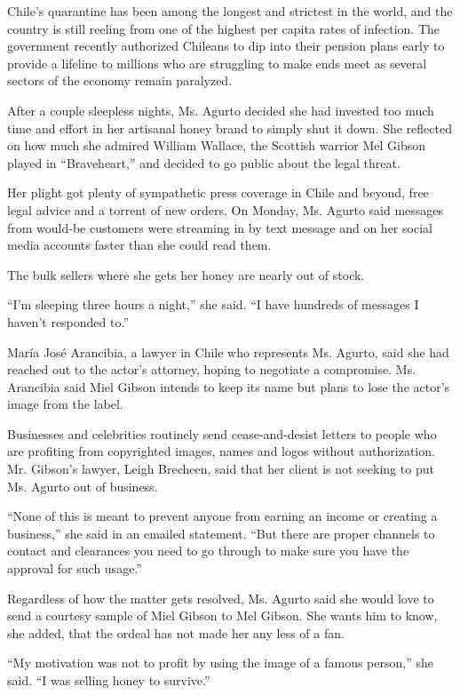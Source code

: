 Chile's quarantine has been among the longest and strictest in the
world, and the country is still reeling from one of the highest per
capita rates of infection. The government recently authorized Chileans
to dip into their pension plans early to provide a lifeline to millions
who are struggling to make ends meet as several sectors of the economy
remain paralyzed.

After a couple sleepless nights, Ms. Agurto decided she had invested too
much time and effort in her artisanal honey brand to simply shut it
down. She reflected on how much she admired William Wallace, the
Scottish warrior Mel Gibson played in ``Braveheart,'' and decided to go
public about the legal threat.

Her plight got plenty of sympathetic press coverage in Chile and beyond,
free legal advice and a torrent of new orders. On Monday, Ms. Agurto
said messages from would-be customers were streaming in by text message
and on her social media accounts faster than she could read them.

The bulk sellers where she gets her honey are nearly out of stock.

``I'm sleeping three hours a night,'' she said. ``I have hundreds of
messages I haven't responded to.''

María José Arancibia, a lawyer in Chile who represents Ms. Agurto, said
she had reached out to the actor's attorney, hoping to negotiate a
compromise. Ms. Arancibia said Miel Gibson intends to keep its name but
plans to lose the actor's image from the label.

Businesses and celebrities routinely send cease-and-desist letters to
people who are profiting from copyrighted images, names and logos
without authorization. Mr. Gibson's lawyer, Leigh Brecheen, said that
her client is not seeking to put Ms. Agurto out of business.

``None of this is meant to prevent anyone from earning an income or
creating a business,'' she said in an emailed statement. ``But there are
proper channels to contact and clearances you need to go through to make
sure you have the approval for such usage.''

Regardless of how the matter gets resolved, Ms. Agurto said she would
love to send a courtesy sample of Miel Gibson to Mel Gibson. She wants
him to know, she added, that the ordeal has not made her any less of a
fan.

``My motivation was not to profit by using the image of a famous
person,'' she said. ``I was selling honey to survive.''

